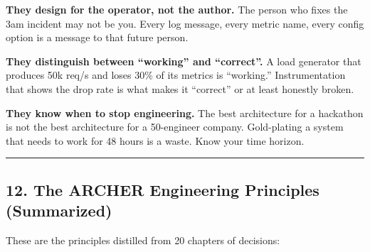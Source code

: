 \documentclass[
]{article}
\begin{document}
\textbf{They design for the operator, not the author.} The person who
fixes the 3am incident may not be you. Every log message, every metric
name, every config option is a message to that future person.

\textbf{They distinguish between ``working'' and ``correct''.} A load
generator that produces 50k req/s and loses 30\% of its metrics is
``working.'' Instrumentation that shows the drop rate is what makes it
``correct'' or at least honestly broken.

\textbf{They know when to stop engineering.} The best architecture for a
hackathon is not the best architecture for a 50-engineer company.
Gold-plating a system that needs to work for 48 hours is a waste. Know
your time horizon.

\begin{center}\rule{0.5\linewidth}{0.5pt}\end{center}

\hypertarget{the-archer-engineering-principles-summarized}{%
\subsection{12. The ARCHER Engineering Principles
(Summarized)}\label{the-archer-engineering-principles-summarized}}

These are the principles distilled from 20 chapters of decisions:
\end{document}
